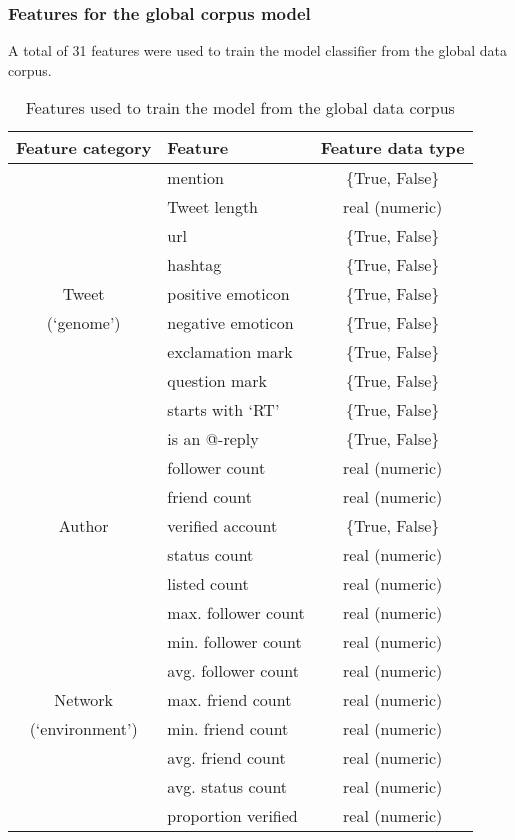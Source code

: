 \subsubsection{Features for the global corpus model}
A total of 31 features were used to train the model classifier from the global data corpus.

\begin{table}[h]\footnotesize
\begin{center}
\begin{tabular}{ c | l | c }
	 Feature category	& Feature & Feature data type \\
	 \hline
	 \hline 
	& mention & \{True, False\}\\
    & Tweet length & real (numeric)\\
    & url & \{True, False\}\\
  	& hashtag & \{True, False\}\\
  	Tweet & positive emoticon & \{True, False\}\\
  	(`genome')& negative emoticon & \{True, False\}\\
  	& exclamation mark & \{True, False\}\\
  	& question mark & \{True, False\}\\
  	& starts with `RT' & \{True, False\}\\
  	& is an @-reply & \{True, False\}\\
  \hline                        
	& follower count & real (numeric)\\
    & friend count  & real (numeric)\\
	Author & verified account & \{True, False\}\\
	& status count & real (numeric)\\
	& listed count & real (numeric)\\
  \hline
  	&  max. follower count & real (numeric)\\
	&  min. follower count & real (numeric)\\
	&  avg. follower count & real (numeric)\\
    Network &  max. friend count & real (numeric)\\
	(`environment') &  min. friend count & real (numeric)\\
	&  avg. friend count & real (numeric)\\  
	&  avg. status count & real (numeric)\\  
  	& proportion verified & real (numeric)\\  
  \hline  
\end{tabular}
\end{center}
\caption{Features used to train the model from the global data corpus}
\label{table:globalfeatures}
\end{table}

